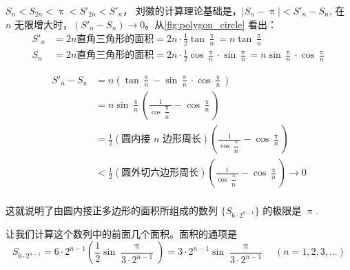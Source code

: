 $S_n<S_{2n}<\uppi<S'_{2n}<S'_n$， 
刘徽的计算理论基础是，$|S_n-\uppi|<S'_n-S_n$, 在 $n$ 无限增大时，$(S'_n-S_n)\to 0$。从\cref{fig:polygon_circle} 看出：
\[\begin{split}
    S'_n&=2n\text{直角三角形的面积}=2n\cdot \frac{1}{2}\tan\frac{\uppi}{n}=n\tan\frac{\uppi}{n}   \\
    S_n&=2n\text{直角三角形的面积}=2n\cdot \frac{1}{2}\cos\frac{\uppi}{n}\cdot \sin \frac{\uppi}{n}=n\sin\frac{\uppi}{n}\cdot \cos\frac{\uppi}{n}
\end{split}\]

\[\begin{split}
    S'_n-S_n &= n\left(\tan\frac{\uppi}{n}-\sin\frac{\uppi}{n}\cdot \cos\frac{\uppi}{n}\right)\\
    &=n \sin\frac{\uppi}{n}\left(\frac{1}{\cos\dfrac{\uppi}{n}}-\cos\frac{\uppi}{n}\right)\\
    &=\frac{1}{2}(\text{圆内接 $n$ 边形周长})\left(\frac{1}{\cos\dfrac{\uppi}{n}}-\cos\frac{\uppi}{n}\right)\\
    &<\frac{1}{2}(\text{圆外切六边形周长})\left(\frac{1}{\cos\dfrac{\uppi}{n}}-\cos\frac{\uppi}{n}\right)\to 0\\
\end{split} \]

这就说明了由圆内接正多边形的面积所组成的数列 $\{S_{6\cdot 2^{n-1}}\}$ 的极限是 $\uppi$. 

让我们计算这个数列中的前面几个面积。面积的通项是
\[S_{6\cdot 2^{n-1}}=6\cdot 2^{n-1}\left(\frac{1}{2}\sin\frac{\uppi}{3\cdot 2^{n-1}}\right)=3\cdot 2^{n-1}\sin\frac{\uppi}{3\cdot 2^{n-1}}\quad (n=1,2,3,\ldots)\]

